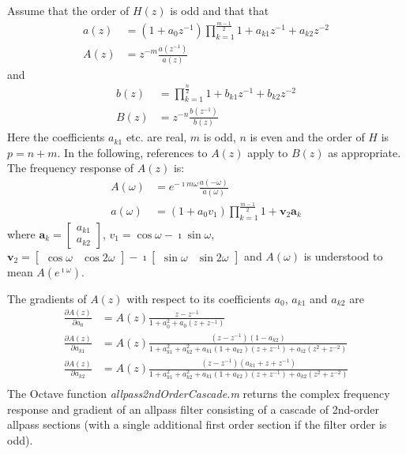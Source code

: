 \documentclass[a4paper,twoside,10pt,english]{report}
\begin{document}
Assume that the order of $H\left(z\right)$ is odd and that
that
\begin{align*}
a\left(z\right) &=
\left(1+a_{0}z^{-1}\right)\prod_{k=1}^{\frac{m-1}{2}}1+a_{k1}z^{-1}+a_{k2}z^{-2}\\
A\left(z\right) &=z^{-m}\frac{a\left(z^{-1}\right)}{a\left(z\right)}
\end{align*}
and
\begin{align*}
b\left(z\right) &=\prod_{k=1}^{\frac{n}{2}}1+b_{k1}z^{-1}+b_{k2}z^{-2}\\
B\left(z\right) &=z^{-n}\frac{b\left(z^{-1}\right)}{b\left(z\right)}
\end{align*}
Here the coefficients $a_{k1}$ etc. are real, $m$ is odd, $n$ is even and the
order of $H$ is $p=n+m$. In the following, references to $A\left(z\right)$ 
apply to $B\left(z\right)$ as appropriate. The frequency response of
$A\left(z\right)$ is:
\begin{align*}
A\left(\omega\right) &=e^{-\imath m\omega}
\frac{a\left(-\omega\right)}{a\left(\omega\right)}\\
a\left(\omega\right) &=\left(1+a_{0}v_{1}\right)
\prod_{k=1}^{\frac{m-1}{2}}1+\boldsymbol{v}_{2}\boldsymbol{a}_{k}
\end{align*}
where $\boldsymbol{a}_{k}=\left[\begin{array}{c}
a_{k1}\\
a_{k2}
\end{array}\right]$, $v_{1}=\cos\omega-\imath\sin\omega$, 
$\boldsymbol{v}_{2}=\left[\begin{array}{cc}
\cos\omega & \cos 2 \omega
\end{array}\right]-\imath\left[\begin{array}{cc}
\sin\omega & \sin 2 \omega
\end{array}\right]$ and $A\left(\omega\right)$ is understood to mean 
$A\left(e^{\imath\omega}\right)$.

The gradients of $A\left(z\right)$ with respect to its coefficients $a_{0}$, 
$a_{k1}$ and $a_{k2}$ are
\begin{align*}
\frac{\partial A\left(z\right)}{\partial a_{0}} &= A\left(z\right)
\frac{z-z^{-1}}{1+a_{0}^{2}+a_{0}\left(z+z^{-1}\right)}\\
\frac{ \partial A\left(z\right)}{\partial a_{k1}} &= A\left(z\right)
\frac{\left(z-z^{-1}\right)\left(1-a_{k2}\right)}
{1+a_{k1}^{2}+a_{k2}^{2}+a_{k1}\left(1+a_{k2}\right)\left(z+z^{-1}\right)+
a_{i2}\left(z^{2}+z^{-2}\right)}\\
\frac{\partial A\left(z\right)}{\partial a_{k2}} &= A\left(z\right)
\frac{\left(z-z^{-1}\right)\left(a_{k1}+z+z^{-1}\right)}
{1+a_{k1}^{2}+a_{k2}^{2}+a_{k1}\left(1+a_{k2}\right)\left(z+z^{-1}\right)+
a_{k2}\left(z^{2}+z^{-2}\right)}\\
\end{align*}
The Octave function \emph{allpass2ndOrderCascade.m} returns the complex
frequency response and gradient of an allpass filter consisting of a cascade of
2nd-order allpass sections (with a single additional first order section if the
filter order is odd). 
\end{document}
